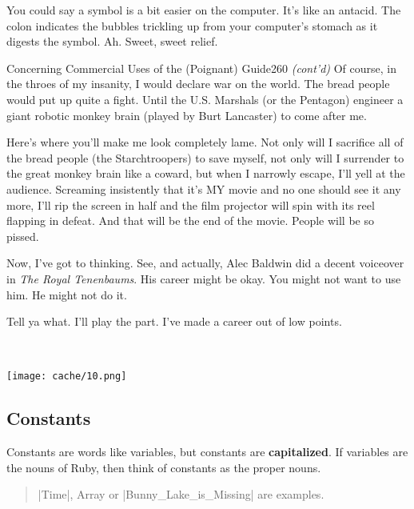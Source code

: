 \documentclass[12pt,twoside]{report}
\newcommand*{\plaininline}{\fontfamily{fvm}\small\selectfont}
\begin{document}
You could say a symbol is a bit easier on the computer.  It's like an
antacid.  The colon indicates the bubbles trickling up from your
computer's stomach as it digests the symbol.  Ah.  Sweet, sweet
relief.

	\begin{sidebar}{Concerning Commercial Uses of the (Poignant) Guide}{260}
		\textit{(cont'd)} Of course, in the throes of my insanity, I would declare war on the world. The bread people would put up quite a fight. Until the U.S. Marshals (or the Pentagon) engineer a giant robotic monkey brain (played by Burt Lancaster) to come after me.\vspace{6pt}
		
		Here's where you'll make me look completely lame. Not only will I sacrifice all of the bread people (the Starchtroopers) to save myself, not only will I surrender to the great monkey brain like a coward, but when I narrowly escape, I'll yell at the audience. Screaming insistently that it's MY movie and no one should see it any more, I'll rip the screen in half and the film projector will spin with its reel flapping in defeat. And that will be the end of the movie. People will be so pissed.\vspace{6pt}
		
		Now, I've got to thinking. See, and actually, Alec Baldwin did a decent voiceover in \textit{The Royal Tenenbaums}. His career might be okay. You might not want to use him. He might not do it.\vspace{6pt}
		
		Tell ya what. I'll play the part. I've made a career out of low points. \vspace{6pt}
	\end{sidebar}


\ %

	\hspace{2.3cm}\texttt{[image: cache/10.png]}

\pagebreak
\mbox{}
\vspace*{-49pt}

\subsection{Constants}



Constants are words like variables, but constants are {\bf
  capitalized}.  If variables are the nouns of Ruby, then think of
constants as the proper nouns.

\begin{quote}
\rubyinline|Time|, {\plaininline Array}
or \rubyinline|Bunny_Lake_is_Missing| are
examples.\end{quote}
\end{document}
